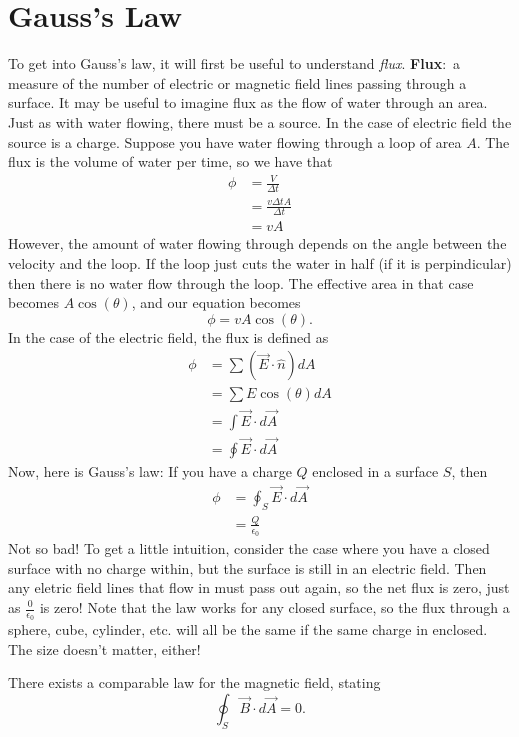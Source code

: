 \documentclass[nobib]{tufte-handout}
\newcommand{\defn}[2]{\noindent\textbf{#1}:\ #2}
\begin{document}
\section{Gauss's Law}
To get into Gauss's law, it will first be useful to understand \emph{flux}. 
\defn{Flux}{a measure of the number of electric or magnetic field lines 
passing through a surface.} 
It may be useful to imagine flux as the flow of water through an area. 
Just as with water flowing, there must be a source. In the case of electric field 
the source is a charge. Suppose you have water flowing through a loop of area $A$. 
The flux is the volume of water per time, so we have that 
\begin{align*}
    \phi &= \frac{V}{\Delta t} \\
    &= \frac{v \Delta t A}{\Delta t} \\
    &= vA
\end{align*}
However, the amount of water flowing through depends on the angle between the 
velocity and the loop. If the loop just cuts the water in half (if it is perpindicular)
then there is no water flow through the loop. The effective area in that case becomes 
$A \cos(\theta)$, and our equation becomes 
\[\phi = vA\cos(\theta).\]
In the case of the electric field, the flux is defined as
\begin{align*}
    \phi &= \sum (\vec{E} \cdot \hat{n}) dA \\
    &= \sum E\cos(\theta) dA \\
    &= \int \vec{E} \cdot d\vec{A} \\
    &= \oint \vec{E} \cdot d\vec{A}
\end{align*}
Now, here is Gauss's law: 
If you have a charge $Q$ enclosed in a surface $S$, 
then 
\begin{align*}
    \phi &= \oint_S \vec{E} \cdot d\vec{A} \\
    &= \frac{Q}{\epsilon_0}
\end{align*}
Not so bad! To get a little intuition, consider
the case where you have a closed surface with 
no charge within, but the surface is still in an
electric field. Then any eletric field lines that 
flow in must pass out again, so the net flux is 
zero, just as $\frac{0}{\epsilon_0}$ is zero!
Note that the law works for any closed surface, so 
the flux through a sphere, cube, cylinder, etc. 
will all be the same if the same charge in enclosed. 
The size doesn't matter, either!

There exists a comparable law for the magnetic field, stating
\[\oint_S \vec{B} \cdot d \vec{A} = 0.\]
\end{document}
